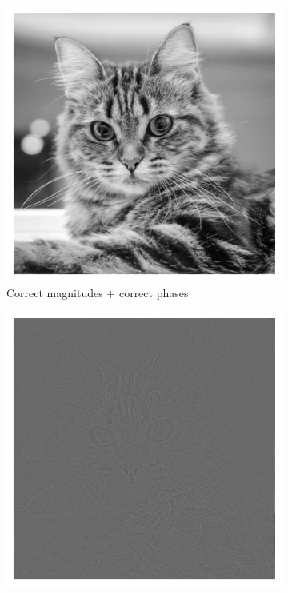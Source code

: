 \documentclass{article}
\theoremstyle{plain}\theoremheaderfont{\normalfont\itshape}\theorembodyfont{\rmfamily}\theoremseparator{.}\newtheorem*{rem}{Remark}\newtheorem*{ex}{Example}\newtheorem*{proof}{Proof}\newtheorem*{altp}{Alternative proof}
\theoremstyle{plain}\theoremheaderfont{\normalfont\bfseries}\theorembodyfont{\rmfamily}\theoremseparator{.}\newtheorem{thm}{Theorem}[section]\newtheorem{lem}[thm]{Lemma}\newtheorem{prop}[thm]{Proposition}\newtheorem*{cor}{Corollary}\newtheorem{defn}[thm]{Definition}\newtheorem{clm}[thm]{Claim}\newtheorem{clminproof}{Claim}\newtheorem*{law}{Law}\newtheorem{pos}[thm]{Postulate}
\theoremstyle{break}\theoremheaderfont{\normalfont\itshape}\theorembodyfont{\rmfamily}\theoremseparator{.\medskip}\newtheorem*{proofskip}{Proof}\newtheorem*{exs}{Examples}\newtheorem*{rems}{Remarks}
\theoremstyle{break}\theoremheaderfont{\normalfont\bfseries}\theorembodyfont{\rmfamily}\theoremseparator{.\medskip}\newtheorem{lemskip}[thm]{Lemma}\newtheorem{defnskip}[thm]{Definition}\newtheorem{propskip}[thm]{Proposition}\newtheorem{thmskip}[thm]{Theorem}
\numberwithin{equation}{section}
\begin{document}
    \begin{figure}[ht!]
        \begin{subfigure}[h]{0.3\linewidth}
            \includegraphics[width=\linewidth]{cat_norm.png}
            \caption{Correct magnitudes + correct phases}
        \end{subfigure}
        \hfill
        \begin{subfigure}[h]{0.3\linewidth}
            \includegraphics[width=\linewidth]{cat_rand_mod.png}

\end{subfigure}
\end{figure}
\end{document}
